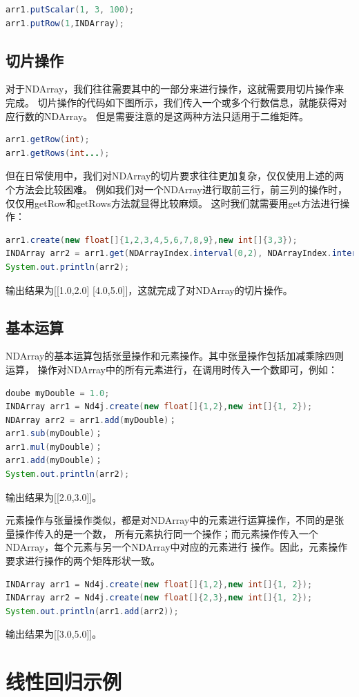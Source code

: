 \begin{lstlisting}[language=Java]
arr1.putScalar(1, 3, 100);
arr1.putRow(1,INDArray);
\end{lstlisting}

\subsection{切片操作}

对于NDArray，我们往往需要其中的一部分来进行操作，这就需要用切片操作来完成。
切片操作的代码如下图所示，我们传入一个或多个行数信息，就能获得对应行数的NDArray。
但是需要注意的是这两种方法只适用于二维矩阵。

\begin{lstlisting}[language=Java]
arr1.getRow(int);
arr1.getRows(int...);
\end{lstlisting}


但在日常使用中，我们对NDArray的切片要求往往更加复杂，仅仅使用上述的两个方法会比较困难。
例如我们对一个NDArray进行取前三行，前三列的操作时，仅仅用getRow和getRows方法就显得比较麻烦。
这时我们就需要用get方法进行操作：

\begin{lstlisting}[language=Java]
arr1.create(new float[]{1,2,3,4,5,6,7,8,9},new int[]{3,3});
INDArray arr2 = arr1.get(NDArrayIndex.interval(0,2), NDArrayIndex.interval(0,2));
System.out.println(arr2);
\end{lstlisting}

\noindent
输出结果为[[1.0,2.0] [4.0,5.0]]，这就完成了对NDArray的切片操作。

\subsection{基本运算}

NDArray的基本运算包括张量操作和元素操作。其中张量操作包括加减乘除四则运算，
操作对NDArray中的所有元素进行，在调用时传入一个数即可，例如：

\begin{lstlisting}[language=Java]
doube myDouble = 1.0;
INDArray arr1 = Nd4j.create(new float[]{1,2},new int[]{1, 2}); 
NDArray arr2 = arr1.add(myDouble)；
arr1.sub(myDouble)；
arr1.mul(myDouble)；
arr1.add(myDouble)；
System.out.println(arr2);
\end{lstlisting}

\noindent
输出结果为[[2.0,3.0]]。


元素操作与张量操作类似，都是对NDArray中的元素进行运算操作，不同的是张量操作传入的是一个数，
所有元素执行同一个操作；而元素操作传入一个NDArray，每个元素与另一个NDArray中对应的元素进行
操作。因此，元素操作要求进行操作的两个矩阵形状一致。

\begin{lstlisting}[language=Java]
INDArray arr1 = Nd4j.create(new float[]{1,2},new int[]{1, 2});
INDArray arr2 = Nd4j.create(new float[]{2,3},new int[]{1, 2});
System.out.println(arr1.add(arr2));
\end{lstlisting}

\noindent
输出结果为[[3.0,5.0]]。


\section{线性回归示例}








